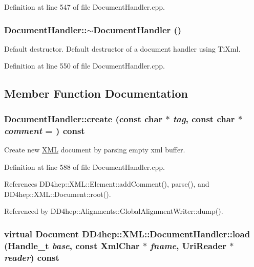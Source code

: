 Definition at line 547 of file DocumentHandler.cpp.\hypertarget{class_d_d4hep_1_1_x_m_l_1_1_document_handler_ac4952ef609acf7234615d2db783ca5fa}{
\subsubsection[{$\sim$DocumentHandler}]{\setlength{\rightskip}{0pt plus 5cm}DocumentHandler::$\sim$DocumentHandler ()}}
\label{class_d_d4hep_1_1_x_m_l_1_1_document_handler_ac4952ef609acf7234615d2db783ca5fa}


Default destructor. Default destructor of a document handler using TiXml. 

Definition at line 550 of file DocumentHandler.cpp.

\subsection{Member Function Documentation}
\hypertarget{class_d_d4hep_1_1_x_m_l_1_1_document_handler_a35782236b2fdfaf3f6f7ed304efa4c21}{
\subsubsection[{create}]{ DocumentHandler::create (const char $\ast$ {\em tag}, \/  const char $\ast$ {\em comment} = {}) const}}
\label{class_d_d4hep_1_1_x_m_l_1_1_document_handler_a35782236b2fdfaf3f6f7ed304efa4c21}


Create new \hyperlink{namespace_d_d4hep_1_1_x_m_l}{XML} document by parsing empty xml buffer. 

Definition at line 588 of file DocumentHandler.cpp.

References DD4hep::XML::Element::addComment(), parse(), and DD4hep::XML::Document::root().

Referenced by DD4hep::Alignments::GlobalAlignmentWriter::dump().\hypertarget{class_d_d4hep_1_1_x_m_l_1_1_document_handler_a9f3c85019249435578aa3ead78ebd341}{
\subsubsection[{load}]{\setlength{\rightskip}{0pt plus 5cm}virtual {\bf Document} DD4hep::XML::DocumentHandler::load ({\bf Handle\_\-t} {\em base}, \/  const {\bf XmlChar} $\ast$ {\em fname}, \/  {\bf UriReader} $\ast$ {\em reader}) const}}
\label{class_d_d4hep_1_1_x_m_l_1_1_document_handler_a9f3c85019249435578aa3ead78ebd341}


